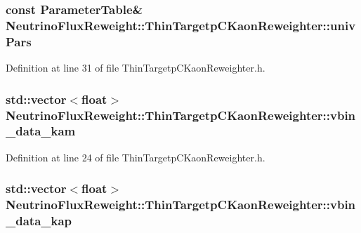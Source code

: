 \hypertarget{class_neutrino_flux_reweight_1_1_thin_targetp_c_kaon_reweighter_a09bb649b2bc0b55691bcd9bc1228536b}{
\subsubsection[{univ\-Pars}]{\setlength{\rightskip}{0pt plus 5cm}const {\bf Parameter\-Table}\& Neutrino\-Flux\-Reweight\-::\-Thin\-Targetp\-C\-Kaon\-Reweighter\-::univ\-Pars\hspace{0.3cm}{\ttfamily [private]}}}\label{class_neutrino_flux_reweight_1_1_thin_targetp_c_kaon_reweighter_a09bb649b2bc0b55691bcd9bc1228536b}


Definition at line 31 of file Thin\-Targetp\-C\-Kaon\-Reweighter.\-h.

\hypertarget{class_neutrino_flux_reweight_1_1_thin_targetp_c_kaon_reweighter_afdc746047f72743b45affc7f51f8ba3f}{
\subsubsection[{vbin\-\_\-data\-\_\-kam}]{\setlength{\rightskip}{0pt plus 5cm}std\-::vector$<$float$>$ Neutrino\-Flux\-Reweight\-::\-Thin\-Targetp\-C\-Kaon\-Reweighter\-::vbin\-\_\-data\-\_\-kam}}\label{class_neutrino_flux_reweight_1_1_thin_targetp_c_kaon_reweighter_afdc746047f72743b45affc7f51f8ba3f}


Definition at line 24 of file Thin\-Targetp\-C\-Kaon\-Reweighter.\-h.

\hypertarget{class_neutrino_flux_reweight_1_1_thin_targetp_c_kaon_reweighter_a7e9b49e61de648fbe1198c3ae68ce15f}{
\subsubsection[{vbin\-\_\-data\-\_\-kap}]{\setlength{\rightskip}{0pt plus 5cm}std\-::vector$<$float$>$ Neutrino\-Flux\-Reweight\-::\-Thin\-Targetp\-C\-Kaon\-Reweighter\-::vbin\-\_\-data\-\_\-kap}}\label{class_neutrino_flux_reweight_1_1_thin_targetp_c_kaon_reweighter_a7e9b49e61de648fbe1198c3ae68ce15f}


